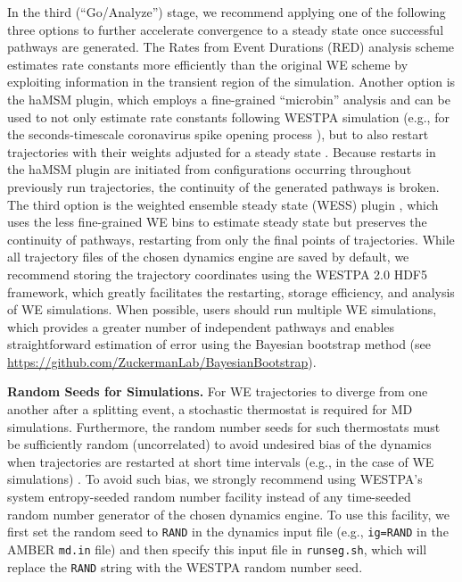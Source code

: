 In the third (“Go/Analyze”) stage, we recommend applying one of the following three options to further accelerate convergence to a steady state once successful pathways are generated. 
The Rates from Event Durations (RED) analysis scheme \citep{degrave_red_2021} estimates rate constants more efficiently than the original WE scheme \citep{huber_weighted-ensemble_1996} by exploiting information in the transient region of the simulation.
Another option is the haMSM plugin, which employs a fine-grained “microbin” analysis and can be used to not only estimate rate constants following WESTPA simulation (e.g., for the seconds-timescale coronavirus spike opening process \citep{casalino_ai-driven_2021}), but to also restart trajectories with their weights adjusted for a steady state \citep{russo_westpa_2022}. 
Because restarts in the haMSM plugin are initiated from configurations occurring throughout previously run trajectories, the continuity of the generated pathways is broken. 
The third option is the weighted ensemble steady state (WESS) plugin \citep{bhatt_steady-state_2010}, which uses the less fine-grained WE bins to estimate steady state but preserves the continuity of pathways, restarting from only the final points of trajectories. 
While all trajectory files of the chosen dynamics engine are saved by default, we recommend storing the trajectory coordinates using the WESTPA 2.0 HDF5 framework, which greatly facilitates the restarting, storage efficiency, and analysis of WE simulations. 
When possible, users should run multiple WE simulations, which provides a greater number of independent pathways and enables straightforward estimation of error using the Bayesian bootstrap method \citep{mostofian_statistical_2019} (see {\url{https://github.com/ZuckermanLab/BayesianBootstrap}}).  

\textbf{Random Seeds for Simulations.} For WE trajectories to diverge from one another after a splitting event, a stochastic thermostat is required for MD simulations. 
Furthermore, the random number seeds for such thermostats must be sufficiently random (uncorrelated) to avoid undesired bias of the dynamics when trajectories are restarted at short time intervals (e.g., in the case of WE simulations) \citep{cerutti_vulnerability_2008}. 
To avoid such bias, we strongly recommend using WESTPA’s system entropy-seeded random number facility instead of any time-seeded random number generator of the chosen dynamics engine. 
To use this facility, we first set the random seed to \verb|RAND| in the dynamics input file (e.g., \verb|ig=RAND| in the AMBER \verb|md.in| file) and then specify this input file in \verb|runseg.sh|, which will replace the \verb|RAND| string with the WESTPA random number seed. 


